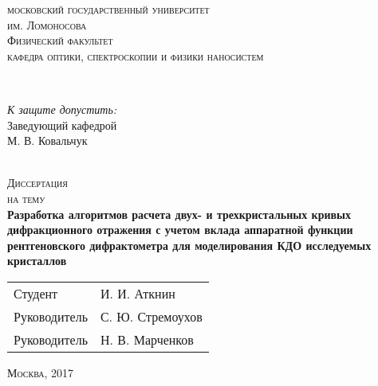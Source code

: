 \begin{titlepage}
  \begin{center}
    \textsc{\small \large московский государственный университет \\ им. Ломоносова}\\
    \textsc{\small Физический факультет}\\
    \textsc{\small кафедра оптики, спектроскопии и физики наносистем}\\[0.5cm]

    \begin{minipage}{\textwidth}
      \begin{flushleft}

      \end{flushleft}
    \end{minipage}\\[0.5cm]
    \begin{minipage}{\textwidth}
      \begin{flushright}
        \textit{К защите допустить:}\\
        Заведующий кафедрой \\
        \underline{\hspace*{4.5cm}} М. В. Ковальчук
      \end{flushright}
    \end{minipage}\\[1.5cm]
    \textsc{\large Диссертация}\\
    \textsc{\small на тему}\\[0.5cm]
    \textbf{\large Разработка алгоритмов расчета двух- и трехкристальных кривых дифракционного отражения с учетом вклада аппаратной функции рентгеновского дифрактометра для моделирования КДО исследуемых кристаллов}\\[5cm]
    {\small
      \begin{tabular}{ l l }
        Студент \hspace*{10cm} & И. И. Аткнин\\
        Руководитель & С. Ю. Стремоухов\\
        Руководитель & Н. В. Марченков

      \end{tabular}
    }
    \vfill
    \textsc{\small Москва, 2017}
  \end{center}
\end{titlepage}

